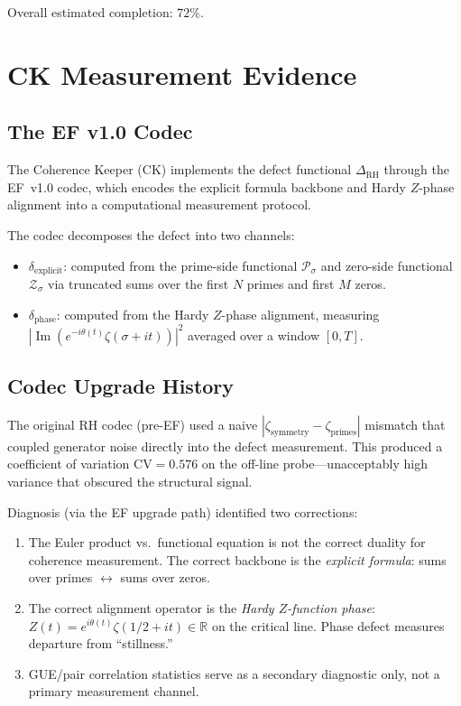 \documentclass[11pt]{article}
\theoremstyle{remark}
\DeclareMathOperator{\Ima}{Im}
\begin{document}
\noindent Overall estimated completion: $72\%$.

\section{CK Measurement Evidence}
\label{sec:measurements}

\subsection{The EF v1.0 Codec}

The Coherence Keeper (CK) implements the defect functional $\Delta_{\mathrm{RH}}$
through the EF~v1.0 codec, which encodes the explicit formula backbone and
Hardy $Z$-phase alignment into a computational measurement protocol.

The codec decomposes the defect into two channels:
\begin{itemize}
  \item \textbf{$\delta_{\mathrm{explicit}}$}: computed from the prime-side functional
    $\mathcal{P}_\sigma$ and zero-side functional $\mathcal{Z}_\sigma$ via
    truncated sums over the first $N$ primes and first $M$ zeros.
  \item \textbf{$\delta_{\mathrm{phase}}$}: computed from the Hardy $Z$-phase
    alignment, measuring $|\Ima(e^{-i\theta(t)}\zeta(\sigma+it))|^2$ averaged over a
    window $[0,T]$.
\end{itemize}

\subsection{Codec Upgrade History}

The original RH codec (pre-EF) used a naive $|\zeta_{\mathrm{symmetry}}-\zeta_{\mathrm{primes}}|$
mismatch that coupled generator noise directly into the defect measurement.
This produced a coefficient of variation $\mathrm{CV}=0.576$ on the off-line probe---unacceptably
high variance that obscured the structural signal.

Diagnosis (via the EF upgrade path) identified two corrections:
\begin{enumerate}
  \item The Euler product vs.\ functional equation is not the correct duality for
    coherence measurement.
    The correct backbone is the \emph{explicit formula}: sums over primes $\leftrightarrow$ sums
    over zeros.
  \item The correct alignment operator is the \emph{Hardy $Z$-function phase}:
    $Z(t)=e^{i\theta(t)}\zeta(1/2+it)\in\mathbb{R}$ on the critical line.
    Phase defect measures departure from ``stillness.''
  \item GUE/pair correlation statistics serve as a secondary diagnostic only, not a
    primary measurement channel.
\end{enumerate}
\end{document}
